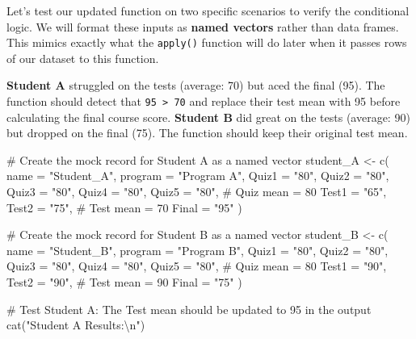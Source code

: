 \documentclass[
  letterpaper,
  DIV=11,
  numbers=noendperiod]{scrreprt}
\newenvironment{Shaded}{\begin{snugshade}}{\end{snugshade}}
\newcommand{\AttributeTok}[1]{\textcolor[rgb]{0.40,0.45,0.13}{#1}}
\newcommand{\CommentTok}[1]{\textcolor[rgb]{0.37,0.37,0.37}{#1}}
\newcommand{\FunctionTok}[1]{\textcolor[rgb]{0.28,0.35,0.67}{#1}}
\newcommand{\NormalTok}[1]{\textcolor[rgb]{0.00,0.23,0.31}{#1}}
\newcommand{\OtherTok}[1]{\textcolor[rgb]{0.00,0.23,0.31}{#1}}
\newcommand{\SpecialCharTok}[1]{\textcolor[rgb]{0.37,0.37,0.37}{#1}}
\newcommand{\StringTok}[1]{\textcolor[rgb]{0.13,0.47,0.30}{#1}}
\begin{document}
Let's test our updated function on two specific scenarios to verify the
conditional logic. We will format these inputs as \textbf{named vectors}
rather than data frames. This mimics exactly what the \texttt{apply()}
function will do later when it passes rows of our dataset to this
function.

\textbf{Student A} struggled on the tests (average: 70) but aced the
final (95). The function should detect that
\texttt{95\ \textgreater{}\ 70} and replace their test mean with 95
before calculating the final course score. \textbf{Student B} did great
on the tests (average: 90) but dropped on the final (75). The function
should keep their original test mean.

\begin{Shaded}
\begin{Highlighting}[]
\CommentTok{\# Create the mock record for Student A as a named vector}
\NormalTok{student\_A }\OtherTok{\textless{}{-}} \FunctionTok{c}\NormalTok{(}
    \AttributeTok{name =} \StringTok{"Student\_A"}\NormalTok{, }\AttributeTok{program =} \StringTok{"Program A"}\NormalTok{,}
    \AttributeTok{Quiz1 =} \StringTok{"80"}\NormalTok{, }\AttributeTok{Quiz2 =} \StringTok{"80"}\NormalTok{, }\AttributeTok{Quiz3 =} \StringTok{"80"}\NormalTok{, }\AttributeTok{Quiz4 =} \StringTok{"80"}\NormalTok{, }\AttributeTok{Quiz5 =} \StringTok{"80"}\NormalTok{, }\CommentTok{\# Quiz mean = 80}
    \AttributeTok{Test1 =} \StringTok{"65"}\NormalTok{, }\AttributeTok{Test2 =} \StringTok{"75"}\NormalTok{,                                           }\CommentTok{\# Test mean = 70}
    \AttributeTok{Final =} \StringTok{"95"}
\NormalTok{)}

\CommentTok{\# Create the mock record for Student B as a named vector}
\NormalTok{student\_B }\OtherTok{\textless{}{-}} \FunctionTok{c}\NormalTok{(}
    \AttributeTok{name =} \StringTok{"Student\_B"}\NormalTok{, }\AttributeTok{program =} \StringTok{"Program B"}\NormalTok{,}
    \AttributeTok{Quiz1 =} \StringTok{"80"}\NormalTok{, }\AttributeTok{Quiz2 =} \StringTok{"80"}\NormalTok{, }\AttributeTok{Quiz3 =} \StringTok{"80"}\NormalTok{, }\AttributeTok{Quiz4 =} \StringTok{"80"}\NormalTok{, }\AttributeTok{Quiz5 =} \StringTok{"80"}\NormalTok{, }\CommentTok{\# Quiz mean = 80}
    \AttributeTok{Test1 =} \StringTok{"90"}\NormalTok{, }\AttributeTok{Test2 =} \StringTok{"90"}\NormalTok{,                                           }\CommentTok{\# Test mean = 90}
    \AttributeTok{Final =} \StringTok{"75"}
\NormalTok{)}

\CommentTok{\# Test Student A: The Test mean should be updated to 95 in the output}
\FunctionTok{cat}\NormalTok{(}\StringTok{"Student A Results:}\SpecialCharTok{\textbackslash{}n}\StringTok{"}\NormalTok{)}
\end{Highlighting}
\end{Shaded}
\end{document}
